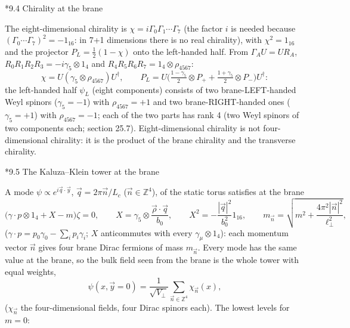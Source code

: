 \documentclass[10pt,a4paper]{article}
\makeatletter
\renewcommand\subsection{\@startsection{subsection}{2}{\z@}{-3.25ex\@plus -1ex \@minus -.2ex}{1.5ex \@plus .2ex}{\normalfont\large\bfseries\raggedright}}
\makeatother
\begin{document}
\subsection*{9.4 Chirality at the brane}
The eight-dimensional chirality is $\chi=i\Gamma_0\Gamma_1\cdots\Gamma_7$ (the factor $i$ is needed because $(\Gamma_0\cdots\Gamma_7)^2=-1_{16}$: in 7+1 dimensions there is no real chirality), with $\chi^2=1_{16}$ and the projector $P_L=\frac12(1-\chi)$ onto the left-handed half. From $\Gamma_AU=UR_A$, $R_0R_1R_2R_3=-i\gamma_5\otimes1_4$ and $R_4R_5R_6R_7=1_4\otimes\rho_{4567}$:
\begin{equation*}
\chi=U(\gamma_5\otimes\rho_{4567})U^\dagger,\qquad P_L=U\Big(\tfrac{1-\gamma_5}2\otimes P_+ +\tfrac{1+\gamma_5}2\otimes P_-\Big)U^\dagger :
\end{equation*}
the left-handed half $\psi_L$ (eight components) consists of two brane-LEFT-handed Weyl spinors ($\gamma_5=-1$) with $\rho_{4567}=+1$ and two brane-RIGHT-handed ones ($\gamma_5=+1$) with $\rho_{4567}=-1$; each of the two parts has rank 4 (two Weyl spinors of two components each; section 25.7). Eight-dimensional chirality is not four-dimensional chirality: it is the product of the brane chirality and the transverse chirality.

\subsection*{9.5 The Kaluza–Klein tower at the brane}
A mode $\psi\propto e^{i\vec q\cdot\vec y}$, $\vec q=2\pi\vec n/L_c$ ($\vec n\in\mathbb Z^4$), of the static torus satisfies at the brane
\begin{equation*}
\big(\gamma\cdot p\otimes1_4+X-m\big)\zeta=0,\qquad X=\gamma_5\otimes\frac{\vec\rho\cdot\vec q}{b_0},\qquad X^2=-\frac{|\vec q|^2}{b_0^2}1_{16},\qquad m_{\vec n}=\sqrt{m^2+\frac{4\pi^2|\vec n|^2}{\ell_\perp^2}},
\end{equation*}
($\gamma\cdot p=p_0\gamma_0-\sum_ip_i\gamma_i$; $X$ anticommutes with every $\gamma_\mu\otimes1_4$): each momentum vector $\vec n$ gives four brane Dirac fermions of mass $m_{\vec n}$. Every mode has the same value at the brane, so the bulk field seen from the brane is the whole tower with equal weights,
\begin{equation*}
\psi(x,\vec y=0)=\frac1{\sqrt{V_\perp}}\sum_{\vec n\in\mathbb Z^4}\chi_{\vec n}(x),
\end{equation*}
($\chi_{\vec n}$ the four-dimensional fields, four Dirac spinors each). The lowest levels for $m=0$:
\end{document}
